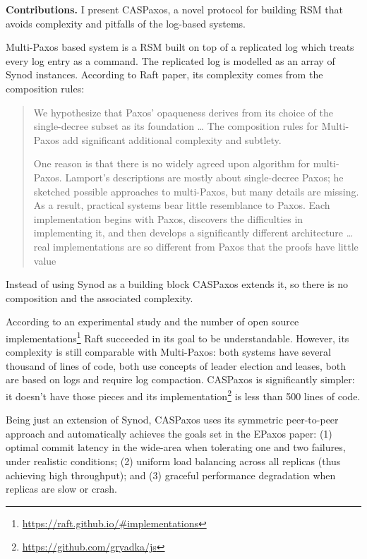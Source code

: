 \documentclass[12pt]{article}
\theoremstyle{definition}
\begin{document}
{\bf Contributions.} I present CASPaxos, a novel protocol for building RSM that avoids complexity and pitfalls of the log-based systems.

Multi-Paxos based system is a RSM built on top of a replicated log which treats every log entry as a command. The replicated log is modelled as an array of Synod instances. According to Raft paper, its complexity comes from the composition rules:

\begin{quote}
We hypothesize that Paxos’ opaqueness derives from its choice of the single-decree subset as its foundation \ldots{} The composition rules for Multi-Paxos add significant additional complexity and subtlety.

One reason is that there is no widely agreed upon algorithm for multi-Paxos. Lamport’s descriptions are mostly about single-decree Paxos; he sketched possible approaches to multi-Paxos, but many details are missing. As a result, practical systems bear little resemblance to Paxos. Each implementation begins with Paxos, discovers the difficulties in implementing it, and then develops a significantly different architecture \ldots{} real implementations are so different from Paxos that the proofs have little value
\end{quote}

Instead of using Synod as a building block CASPaxos extends it, so there is no composition and the associated complexity.

According to an experimental study\cite{raft} and the number of open source implementations\footnote{\href{https://raft.github.io/\#implementations}{https://raft.github.io/\#implementations}} Raft succeeded in its goal to be understandable. However, its complexity is still comparable with Multi-Paxos: both systems\cite{chubby}\cite{raft} have several thousand of lines of code, both use concepts of leader election and leases, both are based on logs and require log compaction. CASPaxos is significantly simpler: it doesn't have those pieces and its implementation\footnote{\href{https://github.com/gryadka/js}{https://github.com/gryadka/js}} is less than 500 lines of code.

Being just an extension of Synod, CASPaxos uses its symmetric peer-to-peer approach and automatically achieves the goals set in the EPaxos\cite{epaxos} paper: (1) optimal commit latency in the wide-area when tolerating one and two failures, under realistic conditions; (2) uniform load balancing across all replicas (thus achieving high throughput); and (3) graceful performance degradation when replicas are slow or crash.
\end{document}
